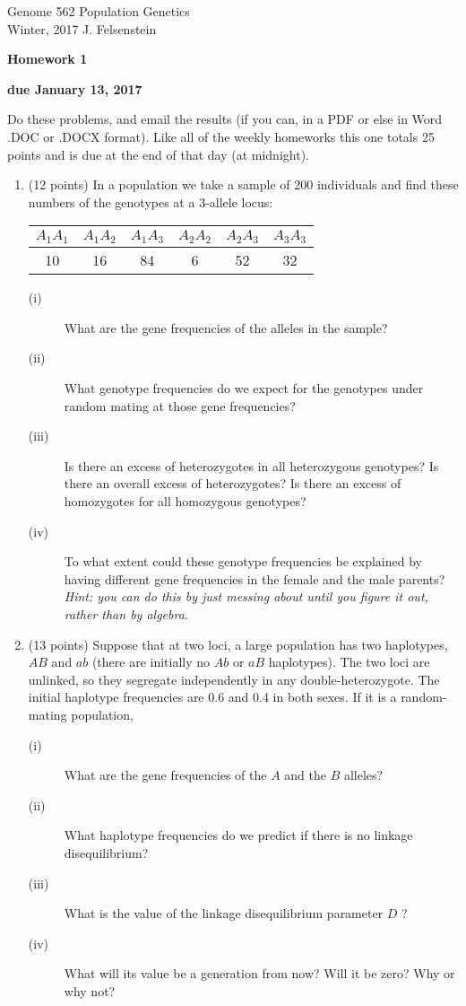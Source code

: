 \documentclass[12pt]{article}
\begin{document}
\noindent
Genome 562 \hfill  Population Genetics \\
Winter, 2017 \hfill  J. Felsenstein

\centerline{\bf Homework 1}
\centerline{\bf due January 13, 2017}

\bigskip

Do these problems, and email the results (if you can, in a PDF or else
in Word .DOC or .DOCX format).  Like all of the weekly homeworks this one
totals 25 points and is due at the end of that day (at midnight).

\bigskip

\begin{enumerate}
\item (12 points)   In a population we take a sample of 200 individuals and
find these numbers of the genotypes at a 3-allele locus:
\begin{center}
\begin{tabular}{c c c c c c}
$A_1 A_1$ & $A_1 A_2$ & $A_1 A_3$ & $A_2 A_2$ & $A_2 A_3$ & $A_3 A_3$ \\
\hline
10 & 16 & 84 & 6 & 52 & 32 \\
\end{tabular}
\end{center}
\begin{description}
\item[(i)] What are the gene frequencies of the alleles in the sample?
\item[(ii)] What genotype frequencies do we expect for the genotypes under
random mating at those gene frequencies?
\item[(iii)] Is there an excess of heterozygotes in all heterozygous
genotypes?  Is there an overall excess of heterozygotes?  Is there an excess of
homozygotes for all homozygous genotypes?
\item[(iv)] To what extent could these genotype frequencies be explained by
having different gene frequencies in the female and the male parents? {\it
Hint: you can do this by just messing about until you figure it out, rather than by algebra.}
\end{description}
\bigskip

\bigskip

\item (13 points)  Suppose that at two loci, a large population has two haplotypes,
$AB$ and $ab$ (there are initially no $Ab$ or $aB$ haplotypes). The two loci
are unlinked, so they segregate independently in any double-heterozygote.
The initial haplotype frequencies are 0.6 and 0.4 in both sexes.
If it is a random-mating population,
\begin{description}
\item[(i)] What are the gene frequencies of the $A$ and the $B$ alleles?
\item[(ii)] What haplotype frequencies do we predict if there is no
linkage disequilibrium?
\item[(iii)] What is the value of the linkage disequilibrium parameter $D$ ?
\item[(iv)] What will its value be a generation from now?  Will it be zero?
Why or why not?
\end{description}

\end{enumerate}
\end{document}

